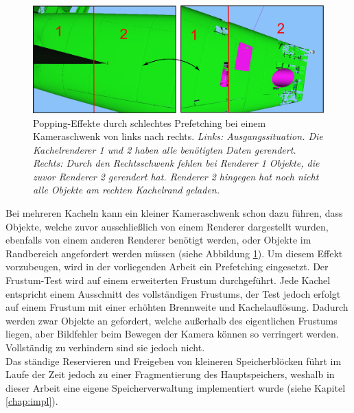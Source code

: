 \begin{figure}
\centering
\includegraphics[scale=0.40]{images/prefetching.pdf}
\caption{\label{fig:basics:prefetching}Popping-Effekte durch schlechtes Prefetching bei einem Kameraschwenk von links nach rechts. \textit{Links: Ausgangssituation. Die Kachelrenderer 1 und 2 haben alle benötigten Daten gerendert. Rechts: Durch den Rechtsschwenk fehlen bei Renderer 1 Objekte, die zuvor Renderer 2 gerendert hat. Renderer 2 hingegen hat noch nicht alle Objekte am rechten Kachelrand geladen.}}
\end{figure}
Bei mehreren Kacheln kann ein kleiner Kameraschwenk schon dazu führen, dass Objekte, welche zuvor ausschließlich von einem Renderer dargestellt wurden, ebenfalls von einem anderen Renderer benötigt werden, oder Objekte im Randbereich angefordert werden müssen (siehe Abbildung \ref{fig:basics:prefetching}). Um diesem Effekt vorzubeugen, wird in der vorliegenden Arbeit ein Prefetching eingesetzt. Der Frustum-Test wird auf einem erweiterten Frustum durchgeführt. Jede Kachel entspricht einem Ausschnitt des vollständigen Frustums, der Test jedoch erfolgt auf einem Frustum mit einer erhöhten Brennweite und Kachelauflösung. Dadurch werden zwar Objekte an gefordert, welche außerhalb des eigentlichen Frustums liegen, aber Bildfehler beim Bewegen der Kamera können so verringert werden. Vollständig zu verhindern sind sie jedoch nicht.\\
Das ständige Reservieren und Freigeben von kleineren Speicherblöcken führt im Laufe der Zeit jedoch zu einer Fragmentierung des Hauptspeichers, weshalb in dieser Arbeit eine eigene Speicherverwaltung implementiert wurde (siehe Kapitel \ref{chap:impl}). 

